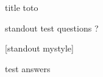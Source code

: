 \documentclass[notheorems, noamsthm, aspectratio=169, 10pt]{beamer}
\begin{document}


   \begin{frame}{title}
      toto
   \end{frame}


   \begin{frame}[standout]{standout test}
      questions ?
   \end{frame}

{[standout mystyle]
   \begin{frame}{test}
      answers
   \end{frame}
}
\end{document}
